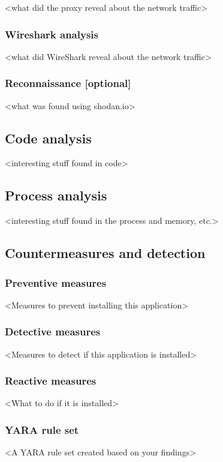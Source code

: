 <what did the proxy reveal about the network traffic>

\subsubsection{Wireshark analysis}

<what did WireShark reveal about the network traffic>

\subsubsection{Reconnaissance [optional]}

<what was found using shodan.io>

\newpage
\subsection{Code analysis}

<interesting stuff found in code>

\newpage
\subsection{Process analysis}

<interesting stuff found in the process and memory, etc.>

\newpage
\subsection{Countermeasures and detection}

\subsubsection{Preventive measures}


<Measures to prevent installing this application>

\subsubsection{Detective measures}

<Measures to detect if this application is installed>

\subsubsection{Reactive measures}

<What to do if it is installed>

\subsubsection{YARA rule set}

<A YARA rule set created based on your findings>

